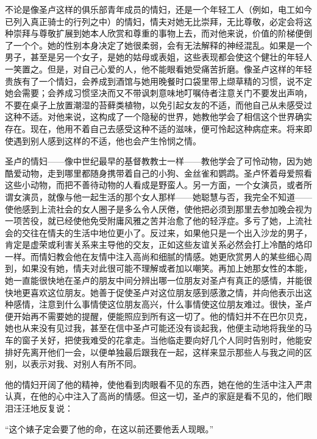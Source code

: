 \par 不论是像圣卢这样的俱乐部青年成员的情妇，还是一个年轻工人（例如，电工如今已列入真正骑士的行列之中）的情妇，情夫对她无比崇拜，无比尊敬，必定会将这种崇拜与尊敬扩展到她本人欣赏和尊重的事物上去，而对他来说，价值的阶梯便倒了一个个。她的性别本身决定了她很柔弱，会有无法解释的神经混乱。如果是一个男子，甚至是另一个女子，是她的姑母或表姐，这些表现都会使这个健壮的年轻人一笑置之。但是，对自己心爱的人，他不能眼看她受痛苦折磨。像圣卢这样的年轻贵族有了一个情妇，会养成到酒馆与她用晚餐时口袋里带上缬草精的习惯，说不定她会需要；会养成习惯坚决而又不带讽刺意味地叮嘱侍者注意关门不要发出声响，不要在桌子上放置潮湿的苔藓类植物，以免引起女友的不适，而他自己从未感受过这种不适。对他来说，这构成了一个隐秘的世界，她教他学会了相信这个世界确实存在。现在，他用不着自己去感受这种不适的滋味，便可怜起这种病症来。将来即使遇到别人感到这样的不适，他也会产生怜悯之情。
\par 圣卢的情妇——像中世纪最早的基督教教士一样——教他学会了可怜动物，因为她酷爱动物，走到哪里都随身携带着自己的小狗、金丝雀和鹦鹉。圣卢怀着母爱照看这些小动物，而把不善待动物的人看成是野蛮人。另一方面，一个女演员，或者所谓女演员，就像与他一起生活的那个女人那样——她聪慧与否，我完全不知道——使他感到上流社会的女人圈子是多么令人厌倦，使他把必须到那里去参加晚会视为一项苦役，就已经使他免受附庸风雅之苦并治愈了他的轻浮症。多亏了她，上流社会的交往在情夫的生活中地位更小了。反过来，如果他只是一个出入沙龙的男子，肯定是虚荣或利害关系来主导他的交友，正如这些友谊关系必然会打上冷酷的烙印一样。而情妇教会他在友情中注入高尚和细腻的情感。她更欣赏男人的某些细心周到，如果没有她，情夫对此很可能不理解或者加以嘲笑。再加上她那女性的本能，她一直能很快地在圣卢的朋友中间分辨出哪一位朋友对圣卢有真正的感情，并能很快地更喜欢这位朋友。她善于促使圣卢对这位朋友感到感激之情，并向他表示出这种感情，注意到什么事情使这位朋友高兴，什么事情使这位朋友难过。很快，圣卢便开始再不需要她的提醒，便能照应到所有这一切了。他的情妇并不在巴尔贝克，她也从来没有见过我，甚至在信中圣卢可能还没有谈起我，他便主动地将我坐的马车的窗子关好，把使我难受的花拿走。当他临走要向好几个人同时告别时，他能安排好先离开他们一会，以便单独最后跟我在一起，这样来显示那些人与我之间的区别，以表示对我、对别人有所不同。
\par 他的情妇开阔了他的精神，使他看到肉眼看不见的东西，她在他的生活中注入严肃认真，在他的心中注入了高尚的情感。但这一切，圣卢的家庭是看不见的，他们眼泪汪汪地反复说：
\par “这个婊子定会要了他的命，在这以前还要他丢人现眼。”
